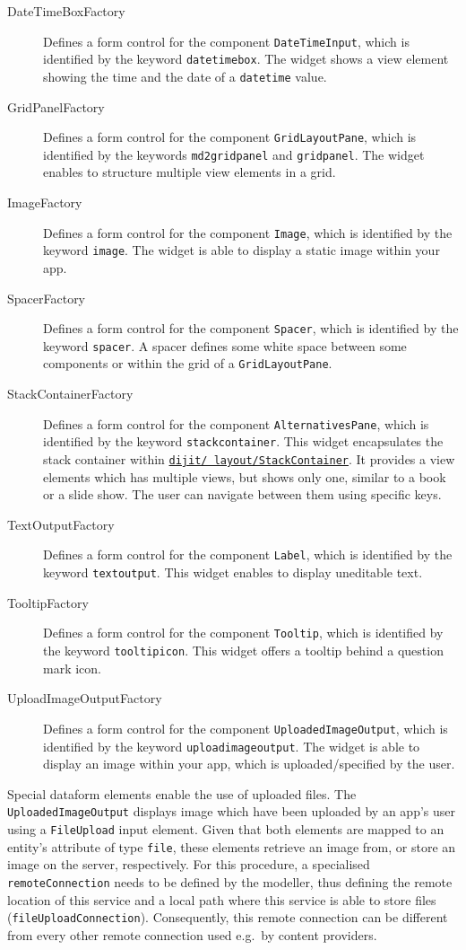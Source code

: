 \begin{description}
	\item[DateTimeBoxFactory] Defines a form control for the component \lstinline|DateTimeInput|, which is identified by the keyword \lstinline|datetimebox|. The widget shows a view element showing the time and the date of a \lstinline|datetime| value.
	\item[GridPanelFactory] Defines a form control for the component \lstinline|GridLayoutPane|, which is identified by the keywords \lstinline|md2gridpanel| and \lstinline|gridpanel|. The widget enables to structure multiple view elements in a grid.
	\item[ImageFactory] Defines a form control for the component \lstinline|Image|, which is identified by the keyword \lstinline|image|. The widget is able to display a static image within your app.
	\item[SpacerFactory] Defines a form control for the component \lstinline|Spacer|, which is identified by the keyword \lstinline|spacer|. A spacer defines some white space between some components or within the grid of a \lstinline|GridLayoutPane|.
	\item[StackContainerFactory] Defines a form control for the component \lstinline|AlternativesPane|, which is identified by the keyword \lstinline|stackcontainer|. This widget encapsulates the stack container within \href{http://dojotoolkit.org/reference-guide/1.10/dijit/layout/StackContainer.html}{\lstinline|dijit/ layout/StackContainer|}. It provides a view elements which has multiple views, but shows only one, similar to a book or a slide show. The user can navigate between them using specific keys. 
	\item[TextOutputFactory] Defines a form control for the component \lstinline|Label|, which is identified by the keyword \lstinline|textoutput|. This widget enables to display uneditable text.
	\item[TooltipFactory] Defines a form control for the component \lstinline|Tooltip|, which is identified by the keyword \lstinline|tooltipicon|. This widget offers a tooltip behind a question mark icon.
	\item[UploadImageOutputFactory] Defines a form control for the component \lstinline|UploadedImageOutput|, which is identified by the keyword \lstinline|uploadimageoutput|. The widget is able to display an image within your app, which is uploaded/specified by the user. 
\end{description}

Special dataform elements enable the use of uploaded files. The \lstinline|UploadedImageOutput| displays image which have been uploaded by an app's user using a \lstinline|FileUpload| input element. Given that both elements are mapped to an entity's attribute of type \lstinline|file|, these elements retrieve an image from, or store an image on the server, respectively. For this procedure, a specialised \lstinline|remoteConnection| needs to be defined by the modeller, thus defining the remote location of this service and a local path where this service is able to store files (\lstinline|fileUploadConnection|). Consequently, this remote connection can be different from every other remote connection used e.g.\ by content providers.

